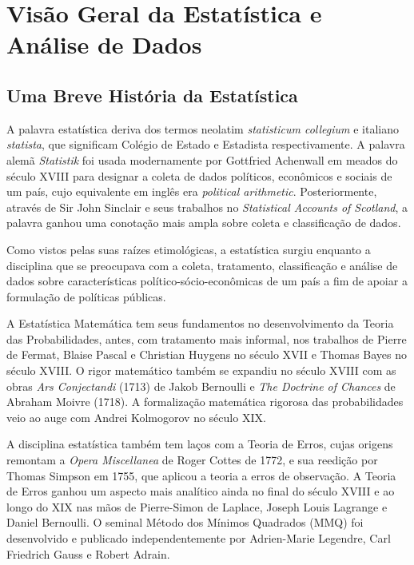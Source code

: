 \section{Visão Geral da Estatística e Análise de Dados}

\subsection{Uma Breve História da Estatística}

A palavra estatística deriva dos termos neolatim \textit{statisticum collegium} e italiano
\textit{statista}, que significam Colégio de Estado e Estadista respectivamente. A palavra
alemã \textit{Statistik} foi usada modernamente por Gottfried Achenwall em meados do
século XVIII para designar a coleta de dados políticos, econômicos e sociais de um país,
cujo equivalente em inglês era \textit{political arithmetic}. Posteriormente, através de
Sir John Sinclair e seus trabalhos no \textit{Statistical Accounts of Scotland}, a palavra
ganhou uma conotação mais ampla sobre coleta e classificação de dados.

Como vistos pelas suas raízes etimológicas, a estatística surgiu enquanto a disciplina
que se preocupava com a coleta, tratamento, classificação e análise de dados sobre
características político-sócio-econômicas de um país a fim de apoiar a formulação de
políticas públicas.

A Estatística Matemática tem seus fundamentos no desenvolvimento da Teoria das
Probabilidades, antes, com tratamento mais informal, nos trabalhos de Pierre de Fermat,
Blaise Pascal e Christian Huygens no século XVII e Thomas Bayes no século XVIII.
O rigor matemático também se expandiu no século XVIII com as obras \textit{Ars Conjectandi}
(1713) de Jakob Bernoulli e \textit{The Doctrine of Chances} de Abraham Moivre (1718).
A formalização matemática rigorosa das probabilidades veio ao auge com Andrei Kolmogorov
no século XIX.

A disciplina estatística também tem laços com a Teoria de Erros, cujas origens remontam
a \textit{Opera Miscellanea} de Roger Cottes de 1772, e sua reedição por Thomas Simpson
em 1755, que aplicou a teoria a erros de observação. A Teoria de Erros ganhou um aspecto
mais analítico ainda no final do século XVIII e ao longo do XIX nas mãos de Pierre-Simon
de Laplace, Joseph Louis Lagrange e Daniel Bernoulli. O seminal Método dos Mínimos Quadrados
(MMQ) foi desenvolvido e publicado independentemente por Adrien-Marie Legendre, Carl
Friedrich Gauss e Robert Adrain.

